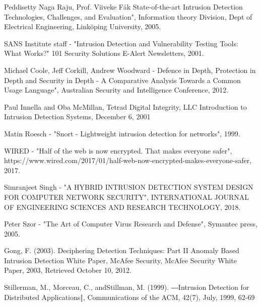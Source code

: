 \documentclass[conference]{IEEEtran}
\begin{document}
%
%
%
\begin{thebibliography}{99}

Peddisetty Naga Raju, Prof. Viiveke Fåk
State-of-the-art Intrusion Detection
Technologies, Challenges, and Evaluation", Information theory Division, Dept of Electrical Engineering, Linköping University, 2005.

SANS Institute staff - "Intrusion Detection and Vulnerability Testing Tools: What Works?"
101 Security Solutions E-Alert Newsletters, 2001.

Michael Coole, Jeff Corkill, Andrew Woodward - Defence in Depth, Protection in Depth and
Security in Depth - A Comparative Analysis Towards a Common Usage Language", Australian Security and Intelligence Conference, 2012.

Paul Innella and Oba McMillan, Tetrad Digital Integrity, LLC Introduction to Intrusion Detection Systems, December 6, 2001
 
Matin Roesch - "Snort - Lightweight intrusion detection for networks", 1999.
 
WIRED - "Half of the web is now encrypted. That makes everyone safer", https://www.wired.com/2017/01/half-web-now-encrypted-makes-everyone-safer, 2017.

Simranjeet Singh - "A HYBRID INTRUSION DETECTION SYSTEM DESIGN FOR COMPUTER NETWORK SECURITY", INTERNATIONAL JOURNAL OF ENGINEERING SCIENCES AND RESEARCH TECHNOLOGY, 2018.

Peter Szor - "The Art of Computer Virus Research and Defense", Symantec press, 2005.

Gong, F. (2003). Deciphering  Detection  Techniques:  Part  II  Anomaly  Based  Intrusion  Detection  White  Paper, McAfee Security, McAfee Security White Paper, 2003, Retrieved October 10, 2012.

Stillerman,  M.,  Morceau,  C., andStillman,  M.  (1999).  ―Intrusion  Detection  for  Distributed  Applications‖, Communications of the ACM, 42(7), July, 1999, 62-69


\end{thebibliography}
\end{document}

